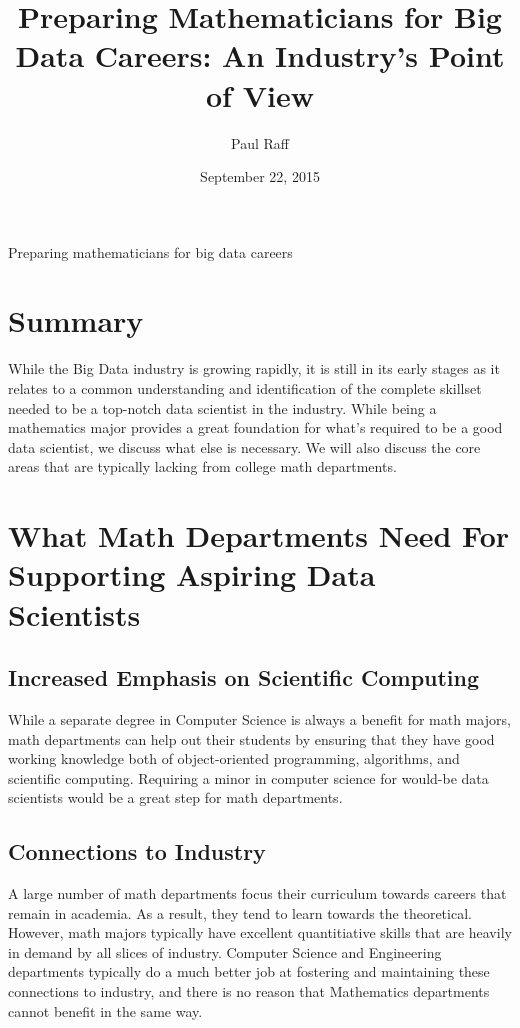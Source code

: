 \documentclass[draft]{article}
\title{Preparing Mathematicians for Big Data Careers: An Industry's Point of View}
\author{Paul Raff}
\date{September 22, 2015}
\theoremstyle{definition}
\theoremstyle{remark}
\begin{document}
\maketitle
{}
{Preparing mathematicians for big data careers}
\renewcommand{\sectionmark}[1]{}

\section{Summary}

While the Big Data industry is growing rapidly, it is still in its early stages as it relates to a common understanding and identification of the complete skillset needed to be a top-notch data scientist in the industry. While being a mathematics major provides a great foundation for what's required to be a good data scientist, we discuss what else is necessary. We will also discuss the core areas that are typically lacking from college math departments. 

\section{What Math Departments Need For Supporting Aspiring Data Scientists}
\subsection{Increased Emphasis on Scientific Computing}
While a separate degree in Computer Science is always a benefit for math majors, math departments can help out their students by ensuring that they have good working knowledge both of object-oriented programming, algorithms, and scientific computing. Requiring a minor in computer science for would-be data scientists would be a great step for math departments. 

\subsection{Connections to Industry}
A large number of math departments focus their curriculum towards careers that remain in academia. As a result, they tend to learn towards the theoretical. However, math majors typically have excellent quantitiative skills that are heavily in demand by all slices of industry. Computer Science and Engineering departments typically do a much better job at fostering and maintaining these connections to industry, and there is no reason that Mathematics departments cannot benefit in the same way. 
\end{document}
